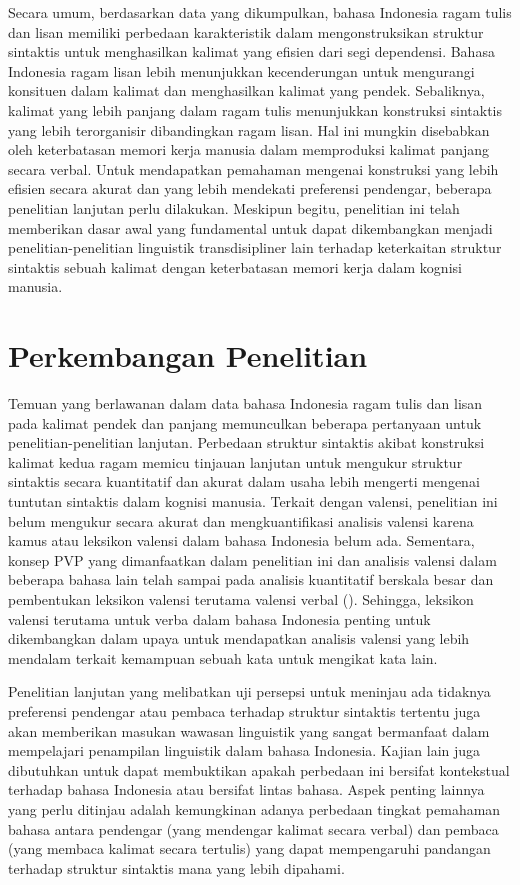 Secara umum, berdasarkan data yang dikumpulkan, bahasa Indonesia ragam tulis dan lisan memiliki perbedaan karakteristik dalam mengonstruksikan struktur sintaktis untuk menghasilkan kalimat yang efisien dari segi dependensi. Bahasa Indonesia ragam lisan lebih menunjukkan kecenderungan untuk mengurangi konsituen dalam kalimat dan menghasilkan kalimat yang pendek. Sebaliknya, kalimat yang lebih panjang dalam ragam tulis menunjukkan konstruksi sintaktis yang lebih terorganisir dibandingkan ragam lisan. Hal ini mungkin disebabkan oleh keterbatasan memori kerja manusia dalam memproduksi kalimat panjang secara verbal. Untuk mendapatkan pemahaman mengenai konstruksi yang lebih efisien secara akurat dan yang lebih mendekati preferensi pendengar, beberapa penelitian lanjutan perlu dilakukan. Meskipun begitu, penelitian ini telah memberikan dasar awal yang fundamental untuk dapat dikembangkan menjadi penelitian-penelitian linguistik transdisipliner lain terhadap keterkaitan struktur sintaktis sebuah kalimat dengan keterbatasan memori kerja dalam kognisi manusia.

\section{Perkembangan Penelitian}

Temuan yang berlawanan dalam data bahasa Indonesia ragam tulis dan lisan pada kalimat pendek dan panjang memunculkan beberapa pertanyaan untuk penelitian-penelitian lanjutan. Perbedaan struktur sintaktis akibat konstruksi kalimat kedua ragam memicu tinjauan lanjutan untuk mengukur struktur sintaktis secara kuantitatif dan akurat dalam usaha lebih mengerti mengenai tuntutan sintaktis dalam kognisi manusia. Terkait dengan valensi, penelitian ini belum mengukur secara akurat dan mengkuantifikasi analisis valensi karena kamus atau leksikon valensi dalam bahasa Indonesia belum ada. Sementara, konsep PVP \citep{liu2006syntactic} yang dimanfaatkan dalam penelitian ini dan analisis valensi dalam beberapa bahasa lain telah sampai pada analisis kuantitatif berskala besar dan pembentukan leksikon valensi terutama valensi verbal (\citealp{zabokrtsky2005valency, bielicky2008building, passarotti2016latin, semecky2006constructing}). Sehingga, leksikon valensi terutama untuk verba dalam bahasa Indonesia penting untuk dikembangkan dalam upaya untuk mendapatkan analisis valensi yang lebih mendalam terkait kemampuan sebuah kata untuk mengikat kata lain. 

Penelitian lanjutan yang melibatkan uji persepsi untuk meninjau ada tidaknya preferensi pendengar atau pembaca terhadap struktur sintaktis tertentu juga akan memberikan masukan wawasan linguistik yang sangat bermanfaat dalam mempelajari penampilan linguistik dalam bahasa Indonesia. Kajian lain juga dibutuhkan untuk dapat membuktikan apakah perbedaan ini bersifat kontekstual terhadap bahasa Indonesia atau bersifat lintas bahasa. Aspek penting lainnya yang perlu ditinjau adalah kemungkinan adanya perbedaan tingkat pemahaman bahasa antara pendengar (yang mendengar kalimat secara verbal) dan pembaca (yang membaca kalimat secara tertulis) yang dapat mempengaruhi pandangan terhadap struktur sintaktis mana yang lebih dipahami. 
